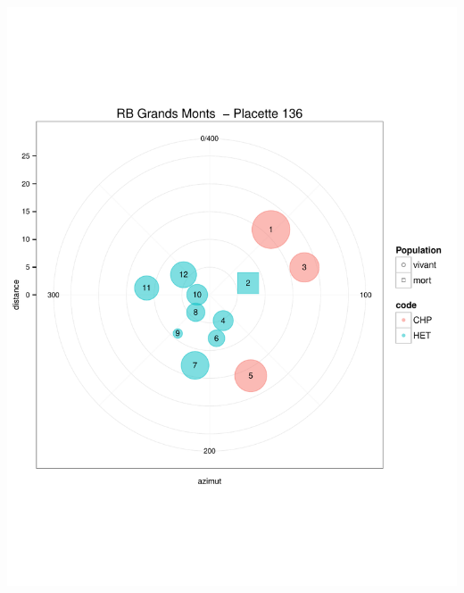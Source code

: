 \documentclass[a4paper]{book}\usepackage[]{graphicx}\usepackage[]{color}
\makeatletter
\def\maxwidth{ %
  \ifdim\Gin@nat@width>\linewidth
    \linewidth
  \else
    \Gin@nat@width
  \fi
}
\newenvironment{knitrout}{}{} %
\makeatother
\begin{document}
\begin{knitrout}
{\centering \includegraphics[width=\maxwidth]{Figures/PlanArbres-9} 

}





\end{knitrout}
\end{document}
